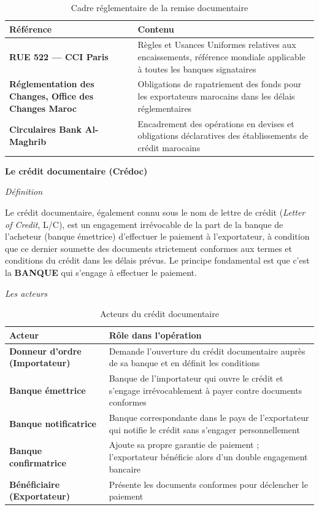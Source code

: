 \begin{table}[h!]
\centering
\begin{tabularx}{\textwidth}{>{\bfseries}l X}
\toprule
Référence & Contenu \\
\midrule
RUE 522 --- CCI Paris & Règles et Usances Uniformes relatives aux encaissements, référence mondiale applicable à toutes les banques signataires \\
\addlinespace
Réglementation des Changes, Office des Changes Maroc & Obligations de rapatriement des fonds pour les exportateurs marocains dans les délais réglementaires \\
\addlinespace
Circulaires Bank Al-Maghrib & Encadrement des opérations en devises et obligations déclaratives des établissements de crédit marocains \\
\bottomrule
\end{tabularx}
\caption{Cadre réglementaire de la remise documentaire}
\end{table}

\medskip\textbf{Le crédit documentaire (Crédoc)}

\medskip\textit{Définition}

Le crédit documentaire, également connu sous le nom de lettre de crédit (\textit{Letter of Credit}, L/C), est un engagement irrévocable de la part de la banque de l'acheteur (banque émettrice) d'effectuer le paiement à l'exportateur, à condition que ce dernier soumette des documents strictement conformes aux termes et conditions du crédit dans les délais prévus. Le principe fondamental est que c'est la \textbf{BANQUE} qui s'engage à effectuer le paiement.

\medskip\textit{Les acteurs}

\begin{table}[h!]
\centering
\begin{tabularx}{\textwidth}{>{\bfseries}l X}
\toprule
Acteur & Rôle dans l'opération \\
\midrule
Donneur d'ordre (Importateur) & Demande l'ouverture du crédit documentaire auprès de sa banque et en définit les conditions \\
\addlinespace
Banque émettrice & Banque de l'importateur qui ouvre le crédit et s'engage irrévocablement à payer contre documents conformes \\
\addlinespace
Banque notificatrice & Banque correspondante dans le pays de l'exportateur qui notifie le crédit sans s'engager personnellement \\
\addlinespace
Banque confirmatrice & Ajoute sa propre garantie de paiement ; l'exportateur bénéficie alors d'un double engagement bancaire \\
\addlinespace
Bénéficiaire (Exportateur) & Présente les documents conformes pour déclencher le paiement \\
\bottomrule
\end{tabularx}
\caption{Acteurs du crédit documentaire}
\end{table}

